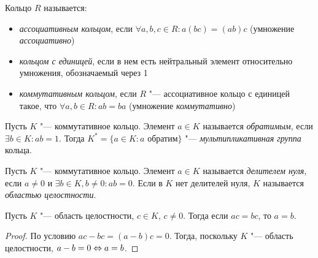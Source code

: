 \begin{definition}
	Кольцо $R$ называется:
	\begin{itemize}
		\item \textit{ассоциативным кольцом}, если $\forall a, b, c \in R: a(bc) = (ab)c$ (умножение \textit{ассоциативно})
		\item \textit{кольцом с единицей}, если в нем есть нейтральный элемент относительно умножения, обозначаемый через 1
		\item \textit{коммутативным кольцом}, если $R$ "--- ассоциативное кольцо с единицей такое, что $\forall a, b \in R: ab = ba$ (умножение \textit{коммутативно})
	\end{itemize}
\end{definition}

\begin{definition}
	Пусть $K$ "--- коммутативное кольцо. Элемент $a \in K$ называется \textit{обратимым}, если $\exists b \in K: ab = 1$. Тогда $K^* = \{a \in K: a \text{ обратим}\}$ "--- \textit{мультипликативная группа} кольца.
\end{definition}

\begin{definition}
	Пусть $K$ "--- коммутативное кольцо. Элемент $a \in K$ называется \textit{делителем нуля}, если $a \ne 0$ и $\exists b \in K, b \ne 0: ab = 0$. Если в $K$ нет делителей нуля, $K$ называется \textit{областью целостности}.
\end{definition}

\begin{proposition}
	Пусть $K$ "--- область целостности, $c \in K$, $c \ne 0$. Тогда если $ac = bc$, то $a = b$.
\end{proposition}

\begin{proof}
	По условию $ac - bc = (a - b)c = 0$. Тогда, поскольку $K$ "--- область целостности, $a - b = 0 \Leftrightarrow a = b$.
\end{proof}